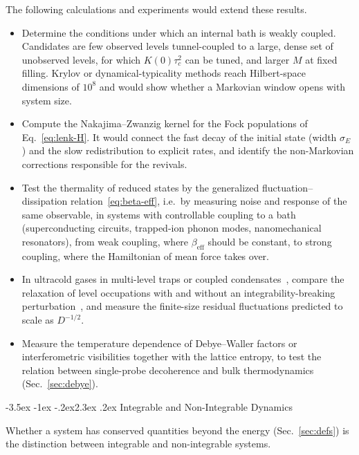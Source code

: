 \documentclass[10pt,a4paper]{article}
\makeatletter
\renewcommand{\section}{\@startsection{section}{1}{\z@}%
  {-3.5ex \@plus -1ex \@minus -.2ex}{2.3ex \@plus .2ex}%
  {\normalfont\fontsize{18pt}{22pt}\selectfont\bfseries}}
\makeatother
\begin{document}
The following calculations and experiments would extend these results.
\begin{itemize}[leftmargin=1.5em]
\item Determine the conditions under which an internal bath is weakly coupled. Candidates are few observed levels tunnel-coupled to a large, dense set of unobserved levels, for which $ K(0)\tau_c^2 $ can be tuned, and larger $ M $ at fixed filling. Krylov or dynamical-typicality methods reach Hilbert-space dimensions of $ 10^8 $ and would show whether a Markovian window opens with system size.
\item Compute the Nakajima--Zwanzig kernel for the Fock populations of Eq.~\eqref{eq:lenk-H}. It would connect the fast decay of the initial state (width $ \sigma_E $) and the slow redistribution to explicit rates, and identify the non-Markovian corrections responsible for the revivals.
\item Test the thermality of reduced states by the generalized fluctuation--dissipation relation~\eqref{eq:beta-eff}, i.e.\ by measuring noise and response of the same observable, in systems with controllable coupling to a bath (superconducting circuits, trapped-ion phonon modes, nanomechanical resonators), from weak coupling, where $ \beta_{\mathrm{eff}} $ should be constant, to strong coupling, where the Hamiltonian of mean force takes over.
\item In ultracold gases in multi-level traps or coupled condensates~\cite{Posazhennikova2016}, compare the relaxation of level occupations with and without an integrability-breaking perturbation~\cite{Kinoshita2006,Langen2015}, and measure the finite-size residual fluctuations predicted to scale as $ D^{-1/2} $.
\item Measure the temperature dependence of Debye--Waller factors or interferometric visibilities together with the lattice entropy, to test the relation between single-probe decoherence and bulk thermodynamics (Sec.~\ref{sec:debye}).
\end{itemize}

\appendix

\section{Integrable and Non-Integrable Dynamics}
\label{app:integrability}

Whether a system has conserved quantities beyond the energy (Sec.~\ref{sec:defs}) is the distinction between integrable and non-integrable systems.
\end{document}
